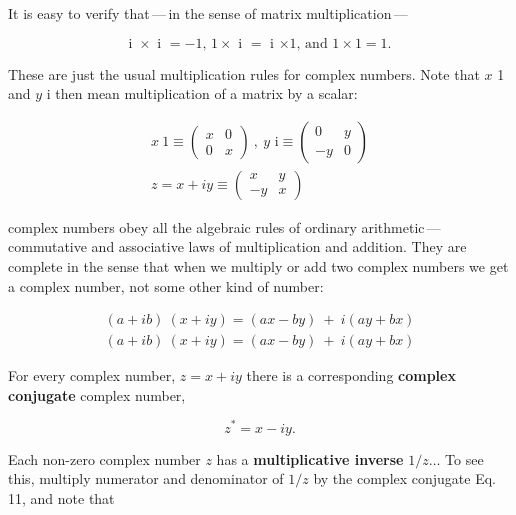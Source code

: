 It is easy to verify that\,---\,in the sense of matrix multiplication\,---

\begin{equation}
  \text{i $\times$ i $= -1$, $1 \times$ i $=$ i $\times 1$, and $1 \times 1 = 1$.}
\end{equation}

These are just the usual multiplication rules for complex numbers. Note that $x$ 1 and $y$ i then mean multiplication of a matrix by a scalar:

\begin{equation*}
  \begin{aligned}
    x\ 1 \equiv
    \begin{pmatrix}
      x & 0 \\ 0 & x
    \end{pmatrix}
    \ ,\ y \text{ i} \equiv
    \begin{pmatrix}
      0 & y \\ -y & 0
    \end{pmatrix}\\
    z = x + iy \equiv
    \begin{pmatrix}
      x & y \\ -y & x
    \end{pmatrix}
  \end{aligned}
\end{equation*}

 complex numbers obey all the algebraic rules of ordinary arithmetic\,---\,commutative and associative laws of multiplication and addition. They are complete in the sense that when we multiply or add two complex numbers we get a complex number, not some other kind of number:

\begin{equation}
  \begin{aligned}
    (a + ib)\ (x + iy) = (ax - by)\ +\ i(ay + bx) \\
    (a + ib)\ (x + iy) = (ax - by)\ +\ i(ay + bx)
  \end{aligned}
\end{equation}

For every complex number, $z = x + iy$ there is a corresponding \textbf{complex conjugate} complex number,

\begin{equation}
  z^* = x - iy.
\end{equation}

Each non-zero complex number $z$ has a \textbf{multiplicative inverse} $1/z\ldots$ To see this, multiply numerator and denominator of $1/z$ by the complex conjugate Eq. 11, and note that

